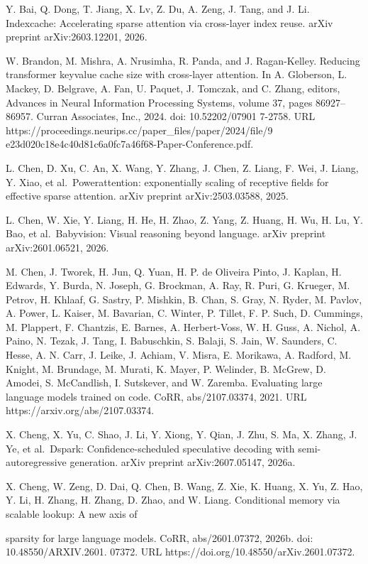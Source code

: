 \documentclass[
  10
]{article}
\begin{document}
Y. Bai, Q. Dong, T. Jiang, X. Lv, Z. Du, A. Zeng, J. Tang, and J. Li.
Indexcache: Accelerating sparse attention via cross-layer index reuse.
arXiv preprint arXiv:2603.12201, 2026.

W. Brandon, M. Mishra, A. Nrusimha, R. Panda, and J. Ragan-Kelley.
Reducing transformer keyvalue cache size with cross-layer attention. In
A. Globerson, L. Mackey, D. Belgrave, A. Fan, U. Paquet, J. Tomczak, and
C. Zhang, editors, Advances in Neural Information Processing Systems,
volume 37, pages 86927--86957. Curran Associates, Inc., 2024. doi:
10.52202/07901 7-2758. URL
https://proceedings.neurips.cc/paper\_files/paper/2024/file/9
e23d020c18e4c40d81c6a0fc7a46f68-Paper-Conference.pdf.

L. Chen, D. Xu, C. An, X. Wang, Y. Zhang, J. Chen, Z. Liang, F. Wei, J.
Liang, Y. Xiao, et al.~Powerattention: exponentially scaling of
receptive fields for effective sparse attention. arXiv preprint
arXiv:2503.03588, 2025.

L. Chen, W. Xie, Y. Liang, H. He, H. Zhao, Z. Yang, Z. Huang, H. Wu, H.
Lu, Y. Bao, et al.~Babyvision: Visual reasoning beyond language. arXiv
preprint arXiv:2601.06521, 2026.

M. Chen, J. Tworek, H. Jun, Q. Yuan, H. P. de Oliveira Pinto, J. Kaplan,
H. Edwards, Y. Burda, N. Joseph, G. Brockman, A. Ray, R. Puri, G.
Krueger, M. Petrov, H. Khlaaf, G. Sastry, P. Mishkin, B. Chan, S. Gray,
N. Ryder, M. Pavlov, A. Power, L. Kaiser, M. Bavarian, C. Winter, P.
Tillet, F. P. Such, D. Cummings, M. Plappert, F. Chantzis, E. Barnes, A.
Herbert-Voss, W. H. Guss, A. Nichol, A. Paino, N. Tezak, J. Tang, I.
Babuschkin, S. Balaji, S. Jain, W. Saunders, C. Hesse, A. N. Carr, J.
Leike, J. Achiam, V. Misra, E. Morikawa, A. Radford, M. Knight, M.
Brundage, M. Murati, K. Mayer, P. Welinder, B. McGrew, D. Amodei, S.
McCandlish, I. Sutskever, and W. Zaremba. Evaluating large language
models trained on code. CoRR, abs/2107.03374, 2021. URL
https://arxiv.org/abs/2107.03374.

X. Cheng, X. Yu, C. Shao, J. Li, Y. Xiong, Y. Qian, J. Zhu, S. Ma, X.
Zhang, J. Ye, et al.~Dspark: Confidence-scheduled speculative decoding
with semi-autoregressive generation. arXiv preprint arXiv:2607.05147,
2026a.

X. Cheng, W. Zeng, D. Dai, Q. Chen, B. Wang, Z. Xie, K. Huang, X. Yu, Z.
Hao, Y. Li, H. Zhang, H. Zhang, D. Zhao, and W. Liang. Conditional
memory via scalable lookup: A new axis of

sparsity for large language models. CoRR, abs/2601.07372, 2026b. doi:
10.48550/ARXIV.2601. 07372. URL
https://doi.org/10.48550/arXiv.2601.07372.
\end{document}
